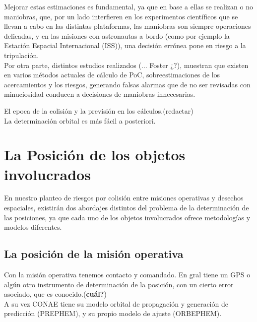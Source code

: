 Mejorar estas estimaciones es fundamental, ya que en base a ellas se realizan o no maniobras, que, por un lado interfieren en los experimentos cient\'ificos que se llevan a cabo en las distintas plataformas, las maniobras son siempre operaciones delicadas, y en las misiones con astronautas a bordo (como por ejemplo la Estaci\'on Espacial Internacional (ISS)), una decisi\'on err\'onea pone en riesgo a la tripulaci\'on.\\

Por otra parte, distintos estudios realizados (... Foster ¿?), muestran que existen en varios m\'etodos actuales de c\'alculo de PoC, sobreestimaciones de los acercamientos y los riesgos, generando falsas alarmas que de no ser revisadas con minuciosidad conducen a decisiones de maniobras innecesarias. 

El epoca de la colisi\'on y la previsi\'on en los c\'alculos.(redactar)\\
La determinaci\'on orbital es m\'as f\'acil a posteriori.\\



\section{La Posici\'on de los objetos involucrados}

En nuestro planteo de riesgos por colisi\'on entre misiones operativas y desechos espaciales, existir\'an dos abordajes distintos del problema de la determinaci\'on de las posiciones, ya que cada uno de los objetos involucrados ofrece metodolog\'ias y modelos diferentes.

\subsection*{La posici\'on de la misi\'on operativa}
Con la misi\'on operativa tenemos contacto y comandado. En gral tiene un GPS o alg\'un otro instrumento de determinaci\'on de la posici\'on, con un cierto error asociado, que es conocido.({\bf{cu\'al?}})\\
A su vez CONAE tiene su modelo orbital de propagaci\'on y generaci\'on de predicci\'on (PREPHEM), y su propio modelo de ajuste (ORBEPHEM).\\

